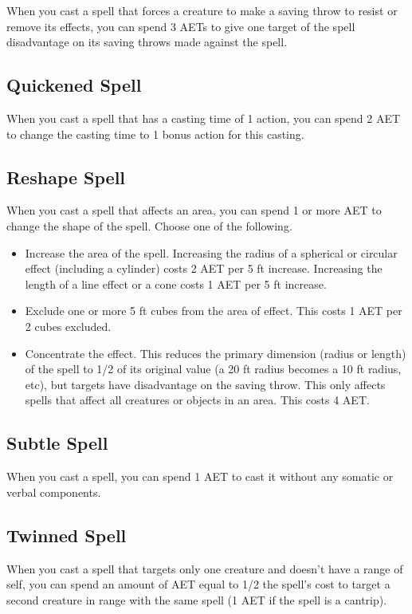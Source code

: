 When you cast a spell that forces a creature to make a saving throw to resist or remove its effects, you can spend 3 AETs to give one target of the spell disadvantage on its saving throws made against the spell.

\subsection{Quickened Spell}

When you cast a spell that has a casting time of 1 action, you can spend 2 AET to change the casting time to 1 bonus action for this casting.

\subsection{Reshape Spell}
When you cast a spell that affects an area, you can spend 1 or more AET to change the shape of the spell. Choose one of the following.
\begin{itemize}
  \item Increase the area of the spell. Increasing the radius of a spherical or circular effect (including a cylinder) costs 2 AET per 5 ft increase. Increasing the length of a line effect or a cone costs 1 AET per 5 ft increase.
  \item Exclude one or more 5 ft cubes from the area of effect. This costs 1 AET per 2 cubes excluded.
  \item Concentrate the effect. This reduces the primary dimension (radius or length) of the spell to 1/2 of its original value (a 20 ft radius becomes a 10 ft radius, etc), but targets have disadvantage on the saving throw. This only affects spells that affect all creatures or objects in an area. This costs 4 AET.
\end{itemize}

\subsection{Subtle Spell}

When you cast a spell, you can spend 1 AET to cast it without any somatic or verbal components.

\subsection{Twinned Spell}

When you cast a spell that targets only one creature and doesn't have a range of self, you can spend an amount of AET equal to 1/2 the spell's cost to target a second creature in range with the same spell (1 AET if the spell is a cantrip).

